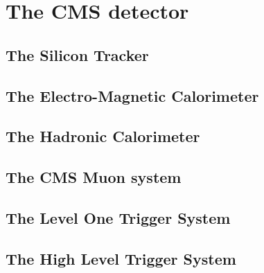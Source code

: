 \chapter{The CMS detector} %
\label{cha:the_cms_detector}

\section{The Silicon Tracker} %
\label{sec:the_silicon_tracker}


\section{The Electro-Magnetic Calorimeter} %
\label{sec:the_electro_magnetic_calorimeter}


\section{The Hadronic Calorimeter} %
\label{sec:the_hadronic_calorimeter}


\section{The CMS Muon system} %
\label{sec:the_cms_muon_system}


\section{The Level One Trigger System} %
\label{sec:the_level_one_trigger_system}


\section{The High Level Trigger System} %
\label{sec:the_high_level_trigger_system}



